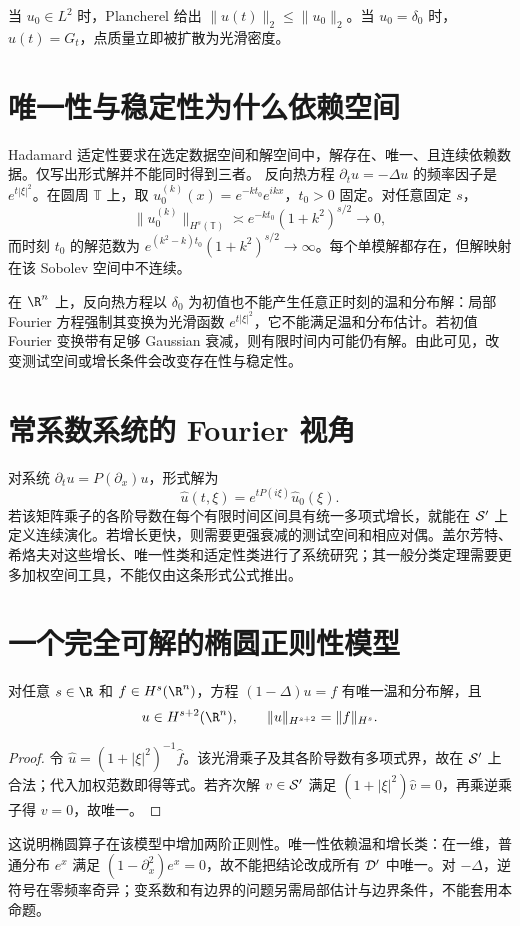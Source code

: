 当 $u_0\in L^2$ 时，Plancherel 给出 $\|u(t)\|_2\le\|u_0\|_2$。当 $u_0=\delta_0$ 时，$u(t)=G_t$，点质量立即被扩散为光滑密度。

\section{唯一性与稳定性为什么依赖空间}
Hadamard 适定性要求在选定数据空间和解空间中，解存在、唯一、且连续依赖数据。仅写出形式解并不能同时得到三者。
反向热方程 $\partial_tu=-\Delta u$ 的频率因子是 $e^{t|\xi|^2}$。在圆周 $\mathbb T$ 上，取 $u_0^{(k)}(x)=e^{-kt_0}e^{ikx}$，$t_0>0$ 固定。对任意固定 $s$，
\[
 \|u_0^{(k)}\|_{H^s(\mathbb T)}\asymp
 e^{-kt_0}(1+k^2)^{s/2}\longrightarrow0,
\]
而时刻 $t_0$ 的解范数为 $e^{(k^2-k)t_0}(1+k^2)^{s/2}\to\infty$。每个单模解都存在，但解映射在该 Sobolev 空间中不连续。

在 $\R^n$ 上，反向热方程以 $\delta_0$ 为初值也不能产生任意正时刻的温和分布解：局部 Fourier 方程强制其变换为光滑函数 $e^{t|\xi|^2}$，它不能满足温和分布估计。若初值 Fourier 变换带有足够 Gaussian 衰减，则有限时间内可能仍有解。由此可见，改变测试空间或增长条件会改变存在性与稳定性。

\section{常系数系统的 Fourier 视角}
对系统 $\partial_tu=P(\partial_x)u$，形式解为
\[
 \widehat u(t,\xi)=e^{tP(i\xi)}\widehat u_0(\xi).
\]
若该矩阵乘子的各阶导数在每个有限时间区间具有统一多项式增长，就能在 $\mathcal{S}'$ 上定义连续演化。若增长更快，则需要更强衰减的测试空间和相应对偶。盖尔芳特、希烙夫对这些增长、唯一性类和适定性类进行了系统研究；其一般分类定理需要更多加权空间工具，不能仅由这条形式公式推出。

\section{一个完全可解的椭圆正则性模型}\label{sec:topic-bessel-regularity}
\begin{proposition}[带质量项的全空间方程]\label{prop:topic-bessel-inverse}
对任意 $s\in\R$ 和 $f\in H^s(\R^n)$，方程 $(1-\Delta)u=f$ 有唯一温和分布解，且
\[
 u\in H^{s+2}(\R^n),\qquad \|u\|_{H^{s+2}}=\|f\|_{H^s}.
\]
\end{proposition}
\begin{proof}
令 $\widehat u=(1+|\xi|^2)^{-1}\widehat f$。该光滑乘子及其各阶导数有多项式界，故在 $\mathcal{S}'$ 上合法；代入加权范数即得等式。若齐次解 $v\in\mathcal{S}'$ 满足 $(1+|\xi|^2)\widehat v=0$，再乘逆乘子得 $v=0$，故唯一。
\end{proof}
这说明椭圆算子在该模型中增加两阶正则性。唯一性依赖温和增长类：在一维，普通分布 $e^x$ 满足 $(1-\partial_x^2)e^x=0$，故不能把结论改成所有 $\mathcal{D}'$ 中唯一。对 $-\Delta$，逆符号在零频率奇异；变系数和有边界的问题另需局部估计与边界条件，不能套用本命题。

